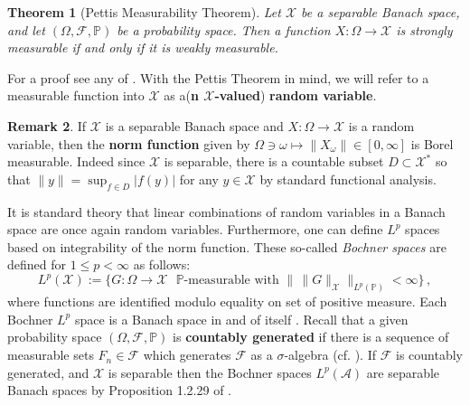 \documentclass{article}
\newcommand{\A}{\mathcal{A}}
\renewcommand{\P}{\mathbb{P}}
\newcommand{\<}{\langle}
\renewcommand{\>}{\rangle}
\newtheorem{thm}{Theorem}[section]
\theoremstyle{definition}
\newtheorem{rmk}[thm]{Remark}
\numberwithin{equation}{section}
\begin{document}
    \begin{thm}[Pettis Measurability Theorem]
        Let $\mathcal{X}$ be a separable Banach space, and let $(\Omega, \mathcal{F}, \P)$ be a probability space. Then a function $X:\Omega \to \mathcal{X}$ is strongly measurable if and only if it is weakly measurable.  
    \end{thm} For a proof see any of \cite{Bharucha-Reid, DiestelUhl, Hytonen_et_al_vol1}. With the Pettis Theorem in mind, we will refer to a measurable function into $\mathcal{X}$ as a(\textbf{n $\mathcal{X}$-valued}) \textbf{random variable}. 
 \begin{rmk}\label{rmk:norm_function}
        If $\mathcal{X}$ is a separable Banach space and $X:\Omega \to \mathcal{X}$ is a random variable, then the \textbf{norm function} given by $\Omega \ni \omega \mapsto \|X_\omega\|\in [0, \infty]$ is Borel measurable. Indeed since $\mathcal{X}$ is separable, there is a countable subset $D\subset \mathcal{X}^*$ so that $\|y\| = \sup_{f\in D}|f(y)|$ for any $y\in \mathcal{X}$ by standard functional analysis. 
    \end{rmk}
    It is standard theory that linear combinations of random variables in a Banach space are once again random variables. Furthermore, one can define $L^p$ spaces based on integrability of the norm function. These so-called \emph{Bochner spaces}  are defined for $1\le p <\infty$ as follows: 
    \[
    	L^p(\mathcal{X}) := \{ G:\Omega \to \mathcal{X} \text{ $\P$-measurable with } \|\, \|G\|_\mathcal{X} \|_{L^p(\P)} <\infty\}\,,
    \] where functions are identified modulo equality on set of positive measure. Each Bochner $L^p$ space is a Banach space in and of itself \cite[Theorem 3.7.8]{HillePhillips}. Recall that a given probability space $(\Omega, \mathcal{F}, \P)$ is \textbf{countably generated} if there is a sequence of measurable sets $F_n\in \mathcal{F}$ which generates $\mathcal{F}$ as a $\sigma$-algebra (cf. \cite[Definition 1.2.27]{Hytonen_et_al_vol1}). If $\mathcal{F}$ is countably generated, and $\mathcal{X}$ is separable then the Bochner spaces $L^p(\A)$ are separable Banach spaces by Proposition 1.2.29 of \cite{Hytonen_et_al_vol1}.   
    
\end{document}
